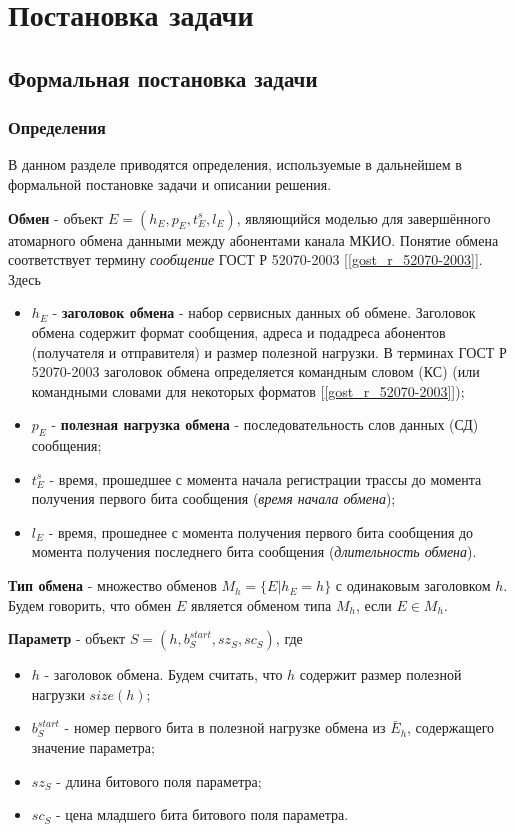 \section{Постановка задачи}

\subsection{Формальная постановка задачи}

\subsubsection{Определения}

В данном разделе приводятся определения, используемые в дальнейшем в 
формальной постановке задачи и описании решения.

\textbf{Обмен} - объект $E = (h_E, p_E, t^s_E, l_E)$, являющийся моделью для 
завершённого атомарного обмена данными между абонентами канала МКИО. Понятие 
обмена соответствует термину \textit{сообщение} ГОСТ Р 52070-2003 
[\ref{gost_r_52070-2003}]. Здесь
\begin{itemize}
 \item $h_E$ - \textbf{заголовок обмена} - набор сервисных данных об обмене. 
 Заголовок обмена содержит формат сообщения, адреса и подадреса абонентов 
(получателя и отправителя) и размер полезной нагрузки. В терминах ГОСТ Р 
52070-2003 заголовок обмена определяется командным словом (КС) (или командными 
словами для некоторых форматов [\ref{gost_r_52070-2003}]);
 \item $p_E$ - \textbf{полезная нагрузка обмена} - последовательность слов 
данных (СД) сообщения;
 \item $t^s_E$ - время, прошедшее с момента начала регистрации трассы до 
момента получения первого бита сообщения (\textit{время начала обмена});
 \item $l_E$ - время, прошеднее с момента получения первого бита сообщения до 
момента получения последнего бита сообщения (\textit{длительность обмена}).
\end{itemize}

\textbf{Тип обмена} - множество обменов $M_h = \{E | h_E = h\}$ с 
одинаковым заголовком $h$. Будем говорить, что обмен $E$ является обменом типа 
$M_h$, если $E \in M_h$.

\textbf{Параметр} - объект $S = (h, b^{start}_S, sz_S, sc_S)$, где

\begin{itemize}
 \item $h$ - заголовок обмена. Будем считать, что $h$ содержит размер полезной 
нагрузки $size(h)$;
 \item $b^{start}_S$ - номер первого бита в полезной нагрузке обмена из 
$\bar{E}_h$, содержащего значение параметра;
 \item $sz_S$ - длина битового поля параметра;
 \item $sc_S$ - цена младшего бита битового поля параметра.
\end{itemize}

